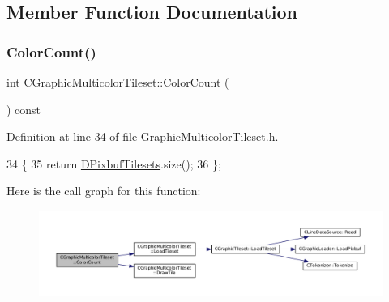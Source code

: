 \subsection{Member Function Documentation}
\hypertarget{classCGraphicMulticolorTileset_abde63a1cef8d3eaeafe5c86f31ab9cae}{}\label{classCGraphicMulticolorTileset_abde63a1cef8d3eaeafe5c86f31ab9cae} 
\subsubsection{\texorpdfstring{Color\+Count()}{ColorCount()}}
{\footnotesize\ttfamily int C\+Graphic\+Multicolor\+Tileset\+::\+Color\+Count (\begin{DoxyParamCaption}{ }\end{DoxyParamCaption}) const\hspace{0.3cm}{\ttfamily [inline]}}



Definition at line 34 of file Graphic\+Multicolor\+Tileset.\+h.


\begin{DoxyCode}
34                               \{
35             \textcolor{keywordflow}{return} \hyperlink{classCGraphicMulticolorTileset_a30809d113b0f314944425a3c8f21408c}{DPixbufTilesets}.size();  
36         \};
\end{DoxyCode}
Here is the call graph for this function\+:\nopagebreak
\begin{figure}[H]
\begin{center}
\leavevmode
\includegraphics[width=350pt]{classCGraphicMulticolorTileset_abde63a1cef8d3eaeafe5c86f31ab9cae_cgraph}
\end{center}
\end{figure}
\hypertarget{classCGraphicMulticolorTileset_a17ee648ac82c48079a1853dc8a10365a}{}\label{classCGraphicMulticolorTileset_a17ee648ac82c48079a1853dc8a10365a} 

